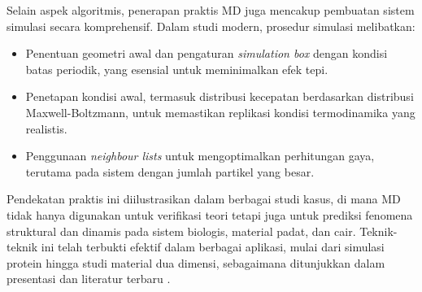 Selain aspek algoritmis, penerapan praktis MD juga mencakup pembuatan sistem simulasi secara komprehensif. Dalam studi modern, prosedur simulasi melibatkan:
\begin{itemize}
    \item Penentuan geometri awal dan pengaturan \emph{simulation box} dengan kondisi batas periodik, yang esensial untuk meminimalkan efek tepi. \item Penetapan kondisi awal, termasuk distribusi kecepatan berdasarkan distribusi Maxwell-Boltzmann, untuk memastikan replikasi kondisi termodinamika yang realistis. \item Penggunaan \emph{neighbour lists} untuk mengoptimalkan perhitungan gaya, terutama pada sistem dengan jumlah partikel yang besar. \end{itemize}

Pendekatan praktis ini diilustrasikan dalam berbagai studi kasus, di mana MD tidak hanya digunakan untuk verifikasi teori tetapi juga untuk prediksi fenomena struktural dan dinamis pada sistem biologis, material padat, dan cair. Teknik-teknik ini telah terbukti efektif dalam berbagai aplikasi, mulai dari simulasi protein hingga studi material dua dimensi, sebagaimana ditunjukkan dalam presentasi dan literatur terbaru \citep{Rapaport2004}. %
